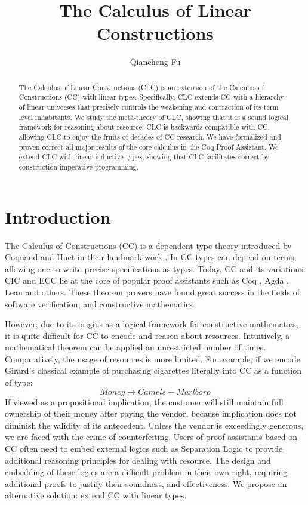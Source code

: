\documentclass[sigplan,screen]{acmart}
\title{The Calculus of Linear Constructions}
\author{Qiancheng Fu}
\affiliation{
  \institution{Boston University}
  \city{Boston}
  \state{MA}
  \country{USA}
}
\theoremstyle{definition}
\begin{document}
  \begin{abstract}
    The Calculus of Linear Constructions (CLC) is an extension of the Calculus of Constructions (CC) with linear types. Specifically, CLC extends CC with a hierarchy of linear universes that precisely controls the weakening and contraction of its term level inhabitants. We study the meta-theory of CLC, showing that it is a sound logical framework for reasoning about resource. CLC is backwards compatible with CC, allowing CLC to enjoy the fruits of decades of CC research. We have formalized and proven correct all major results of the core calculus in the Coq Proof Assistant. We extend CLC with linear inductive types, showing that CLC facilitates correct by construction imperative programming.
  \end{abstract}
  \maketitle 

  \section{Introduction}
  The Calculus of Constructions (CC) is a dependent type theory introduced by Coquand and Huet in their landmark work \cite{cc}. In CC types can depend on terms, allowing one to write precise specifications as types. Today, CC and its variations CIC \cite{cic} and ECC \cite{ecc} lie at the core of popular proof assistants such as Coq \cite{coq}, Agda \cite{agda}, Lean \cite{lean} and others. These theorem provers have found great success in the fields of software verification, and constructive mathematics. 
  
  However, due to its origins as a logical framework for constructive mathematics, it is quite difficult for CC to encode and reason about resources. Intuitively, a mathematical theorem can be applied an unrestricted number of times. Comparatively, the usage of resources is more limited. For example, if we encode Girard's classical example \cite{girard95} of purchasing cigarettes literally into CC as a function of type:
  \begin{equation*}
    Money \rightarrow Camels + Marlboro
  \end{equation*}
  If viewed as a propositional implication, the customer will still maintain full ownership of their money after paying the vendor, because implication does not diminish the validity of its antecedent. Unless the vendor is exceedingly generous, we are faced with the crime of counterfeiting. Users of proof assistants based on CC often need to embed external logics such as Separation Logic to provide additional reasoning principles for dealing with resource. The design and embedding of these logics are a difficult problem in their own right, requiring additional proofs to justify their soundness, and effectiveness. We propose an alternative solution: extend CC with linear types.
\end{document}
